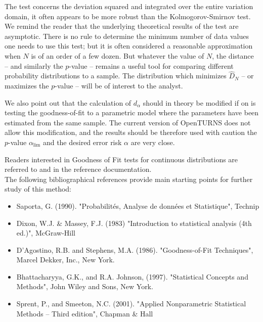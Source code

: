 {
  The test concerns the deviation squared and integrated over the entire variation domain, it often appears to be more robust than the Kolmogorov-Smirnov test.\\

  We remind the reader that the underlying theoretical results of the test are asymptotic. There is no rule to determine the minimum number of data values one needs to use this test; but it is often considered a reasonable approximation when $N$ is of an order of a few dozen. But whatever the value of $N$, the distance -- and similarly the $p$-value -- remains a useful tool for comparing different probability distributions to a sample. The distribution which minimizes $\widehat{D}_N$ -- or maximizes the $p$-value -- will be of interest to the analyst.

  We also point out that the calculation of $d_\alpha$ should in theory be modified if on is testing the goodness-of-fit to a parametric model where the parameters have been estimated from the same sample. The current version of OpenTURNS does not allow this modification, and the results should be therefore used with caution the $p$-value $\alpha_\textrm{lim}$ and the desired error risk $\alpha$ are very close.

  Readers interested in Goodness of Fit tests for continuous distributions are referred to  and  in the reference documentation. \\

  The following bibliographical references provide main starting points for further study of this method:

  \begin{itemize}
  \item Saporta, G. (1990). "Probabilités, Analyse de données et Statistique", Technip
  \item Dixon, W.J. \& Massey, F.J. (1983) "Introduction to statistical analysis (4th ed.)", McGraw-Hill
  \item D'Agostino, R.B. and Stephens, M.A. (1986). "Goodness-of-Fit Techniques", Marcel Dekker, Inc., New York.
  \item Bhattacharyya, G.K., and R.A. Johnson, (1997). "Statistical Concepts and Methods", John Wiley and Sons, New York.
  \item Sprent, P., and Smeeton, N.C. (2001). "Applied Nonparametric Statistical Methods -- Third edition", Chapman \& Hall
  \end{itemize}
}
